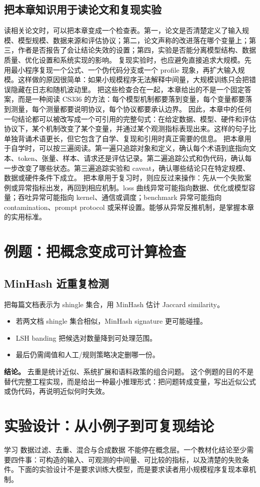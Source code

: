 \documentclass[a4paper]{article}
\begin{document}
\subsection{把本章知识用于读论文和复现实验}
读相关论文时，可以把本章变成一个检查表。第一，论文是否清楚定义了输入规模、模型规模、数据来源和评估协议；第二，论文声称的改进落在哪个变量上；第三，作者是否报告了会让结论失效的设置；第四，实验是否能分离模型结构、数据质量、优化设置和系统实现的影响。
复现实验时，也应避免直接追求大规模。先用最小程序复现一个公式、一个伪代码分支或一个 profile 现象，再扩大输入规模。这样做的原因很简单：如果小规模程序无法解释中间量，大规模训练只会把错误隐藏在日志和随机波动里。
把这些检查合在一起，本章给出的不是一个固定答案，而是一种阅读 CS336 的方法：每个模型机制都要落到变量，每个变量都要落到测量，每个测量都要说明协议，每个协议都要承认边界。
因此，本章中的任何一句结论都可以被改写成一个可引用的完整句式：在给定数据、模型、硬件和评估协议下，某个机制改变了某个变量，并通过某个观测指标表现出来。这样的句子比单独背诵术语更长，但它包含了自学、复现和引用时真正需要的信息。
把本章用于自学时，可以按三遍阅读。第一遍只追踪对象和定义，确认每个术语到底指向文本、token、张量、样本、请求还是评估记录。第二遍追踪公式和伪代码，确认每一步改变了哪些状态。第三遍追踪实验和 caveat，确认哪些结论只在特定规模、数据或硬件条件下成立。
把本章用于复习时，则应反过来操作：先从一个失败案例或异常指标出发，再回到相应机制。loss 曲线异常可能指向数据、优化或模型容量；吞吐异常可能指向 kernel、通信或调度；benchmark 异常可能指向 contamination、prompt protocol 或采样设置。能够从异常反推机制，是掌握本章的实用标准。
\section{例题：把概念变成可计算检查}
\subsection{MinHash 近重复检测}
把每篇文档表示为 shingle 集合，用 MinHash 估计 Jaccard similarity。
\begin{itemize}
\item 若两文档 shingle 集合相似，MinHash signature 更可能碰撞。
\item LSH banding 把候选对数量降到可处理范围。
\item 最后仍需阈值和人工/规则策略决定删哪一份。
\end{itemize}
\textbf{结论。} 去重是统计近似、系统扩展和语料政策的组合问题。
这个例题的目的不是替代完整工程实现，而是给出一种最小推理形式：把问题转成变量，写出近似公式或伪代码，再说明近似何时失效。
\section{实验设计：从小例子到可复现结论}
学习 数据过滤、去重、混合与合成数据 不能停在概念层。一个教材化结论至少需要四件事：可构造的输入、可观测的中间量、可比较的指标，以及清楚的失败条件。下面的实验设计不是要求训练大模型，而是要求读者用小规模程序复现本章机制。
\end{document}
